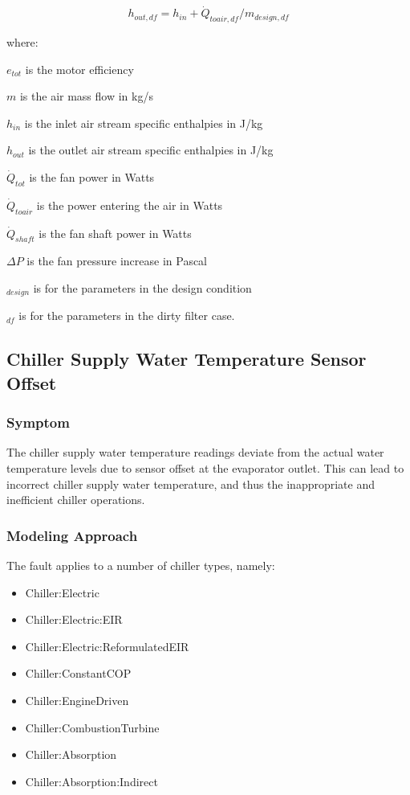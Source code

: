 \begin{equation}
h_{out,df} = h_{in} + \dot{Q}_{toair,df} / m_{design,df}
\end{equation}

where:

\(e_{tot}\) is the motor efficiency

\(m\) is the air mass flow in kg/s

\(h_{in}\) is the inlet air stream specific enthalpies in J/kg

\(h_{out}\) is the outlet air stream specific enthalpies in J/kg

\(\dot{Q}_{tot}\) is the fan power in Watts

\(\dot{Q}_{toair}\) is the power entering the air in Watts

\(\dot{Q}_{shaft}\) is the fan shaft power in Watts

\(\Delta P\) is the fan pressure increase in Pascal

\(_{design}\) is for the parameters in the design condition

\(_{df}\) is for the parameters in the dirty filter case.


\subsection{Chiller Supply Water Temperature Sensor Offset}\label{chiller-supply-water-temperature-sensor-offset}

\subsubsection{Symptom}

The chiller supply water temperature readings deviate from the actual water temperature levels due to sensor offset at the evaporator outlet. This can lead to incorrect chiller supply water temperature, and thus the inappropriate and inefficient chiller operations.

\subsubsection{Modeling Approach}

The fault applies to a number of chiller types, namely:

\begin{itemize}
\tightlist
\item
  Chiller:Electric
\item
  Chiller:Electric:EIR
\item
  Chiller:Electric:ReformulatedEIR
\item
  Chiller:ConstantCOP
\item
  Chiller:EngineDriven
\item
  Chiller:CombustionTurbine
\item
  Chiller:Absorption
\item
  Chiller:Absorption:Indirect
\end{itemize}

